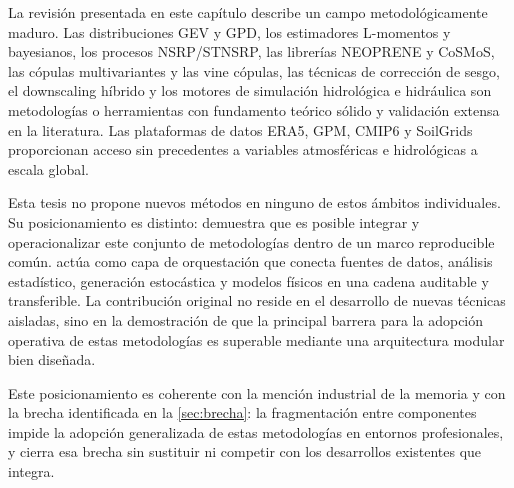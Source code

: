 La revisión presentada en este capítulo describe un campo metodológicamente maduro. Las distribuciones GEV y GPD, los estimadores L-momentos y bayesianos, los procesos NSRP/STNSRP, las librerías NEOPRENE y CoSMoS, las cópulas multivariantes y las vine cópulas, las técnicas de corrección de sesgo, el downscaling híbrido y los motores de simulación hidrológica e hidráulica son metodologías o herramientas con fundamento teórico sólido y validación extensa en la literatura. Las plataformas de datos ERA5, GPM, CMIP6 y SoilGrids proporcionan acceso sin precedentes a variables atmosféricas e hidrológicas a escala global.

Esta tesis no propone nuevos métodos en ninguno de estos ámbitos individuales. Su posicionamiento es distinto: demuestra que es posible integrar y operacionalizar este conjunto de metodologías dentro de un marco reproducible común. \hydra actúa como capa de orquestación que conecta fuentes de datos, análisis estadístico, generación estocástica y modelos físicos en una cadena auditable y transferible. La contribución original no reside en el desarrollo de nuevas técnicas aisladas, sino en la demostración de que la principal barrera para la adopción operativa de estas metodologías es superable mediante una arquitectura modular bien diseñada.

Este posicionamiento es coherente con la mención industrial de la memoria y con la brecha identificada en la \cref{sec:brecha}: la fragmentación entre componentes impide la adopción generalizada de estas metodologías en entornos profesionales, y \hydra cierra esa brecha sin sustituir ni competir con los desarrollos existentes que integra.

